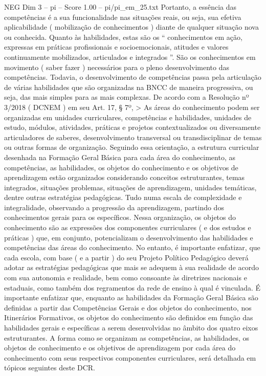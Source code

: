 \begin{textsample}{NEG Dim 3 – pi – Score 1.00 – pi/pi\_em\_25.txt}
Portanto, a essência das competências é a sua funcionalidade nas situações reais, ou seja, sua efetiva aplicabilidade ( mobilização de conhecimentos ) diante de qualquer situação nova ou conhecida.
Quanto às habilidades, estas são os “ conhecimentos em ação, expressas em práticas profissionais e socioemocionais, atitudes e valores continuamente mobilizados, articulados e integrados ”.
São os conhecimentos em movimento ( saber fazer ) necessários para o pleno desenvolvimento das competências.
Todavia, o desenvolvimento de competências passa pela articulação de várias habilidades que são organizadas na BNCC de maneira progressiva, ou seja, das mais simples para as mais complexas.
De acordo com a Resolução nº 3/2018 ( DCNEM ) em seu Art. 17, § 7º, > As áreas do conhecimento podem ser organizadas em unidades curriculares, competências e habilidades, unidades de estudo, módulos, atividades, práticas e projetos contextualizados ou diversamente articuladores de saberes, desenvolvimento transversal ou transdisciplinar de temas ou outras formas de organização.
Seguindo essa orientação, a estrutura curricular desenhada na Formação Geral Básica para cada área do conhecimento, as competências, as habilidades, os objetos do conhecimento e os objetivos de aprendizagem estão organizados considerando conceitos estruturantes, temas integrados, situações problemas, situações de aprendizagem, unidades temáticas, dentre outras estratégias pedagógicas.
Tudo numa escala de complexidade e integralidade, observando a progressão da aprendizagem, partindo dos conhecimentos gerais para os específicos.
Nessa organização, os objetos do conhecimento são as expressões dos componentes curriculares ( e dos estudos e práticas ) que, em conjunto, potencializam o desenvolvimento das habilidades e competências das áreas do conhecimento.
No entanto, é importante enfatizar, que cada escola, com base ( e a partir ) do seu Projeto Político Pedagógico deverá adotar as estratégias pedagógicas que mais se adequem à sua realidade de acordo com sua autonomia e realidade, bem como consoante às diretrizes nacionais e estaduais, como também dos regramentos da rede de ensino à qual é vinculada.
É importante enfatizar que, enquanto as habilidades da Formação Geral Básica são definidas a partir das Competências Gerais e dos objetos do conhecimento, nos Itinerários Formativos, os objetos do conhecimento são definidos em função das habilidades gerais e específicas a serem desenvolvidas no âmbito dos quatro eixos estruturantes.
A forma como se organizam as competências, as habilidades, os objetos de conhecimento e os objetivos de aprendizagem por cada área do conhecimento com seus respectivos componentes curriculares, será detalhada em tópicos seguintes deste DCR.

\end{textsample}
